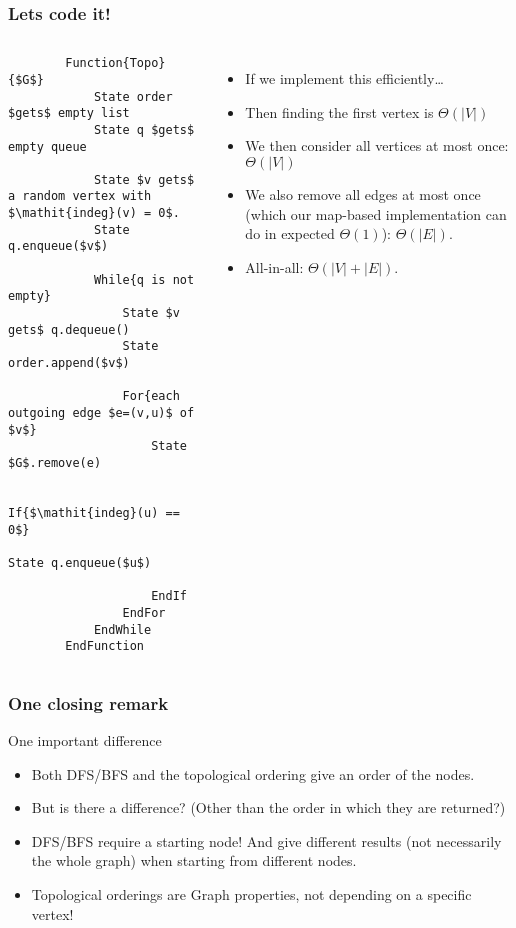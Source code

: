 \begin{frame}[fragile]
	\frametitle{Lets code it!}
	
	\begin{columns}[T]
		{
	\small
	\begin{lstlisting}
		Function{Topo}{$G$}
			State order $gets$ empty list
			State q $gets$ empty queue
		
			State $v gets$ a random vertex with $\mathit{indeg}(v) = 0$.
			State q.enqueue($v$)
		
			While{q is not empty}
				State $v gets$ q.dequeue()
				State order.append($v$)
		
				For{each outgoing edge $e=(v,u)$ of $v$}
					State $G$.remove(e)
		
					If{$\mathit{indeg}(u) == 0$}
						State q.enqueue($u$)
		
					EndIf
				EndFor
			EndWhile
		EndFunction
	\end{lstlisting}
}
			
				\begin{itemize}
					\item If we implement this efficiently\dots
						
					\item Then finding the first vertex is $\Theta(|V|)$
						
					\item We then consider all vertices at most once: $\Theta(|V|)$
						
					\item We also remove all edges at most once (which our map-based implementation can do in expected
						$\Theta(1)$): $\Theta(|E|)$.
					\item All-in-all: $\Theta(|V| + |E|)$.
				\end{itemize}	
		
	\end{columns}
\end{frame}

\begin{frame}
	\frametitle{One closing remark}
	
One important difference
				\begin{itemize}
					\item Both DFS/BFS and the topological ordering give an order of the nodes.
					\item But is there a difference? (Other than the order in which they are returned?)
				\end{itemize}

		
				\begin{itemize}
					\item DFS/BFS require a starting node! And give different results (not necessarily the whole graph) when starting from
			different nodes.
								\item 
			Topological orderings are Graph properties, not depending on a specific vertex!
				\end{itemize}
\end{frame}

